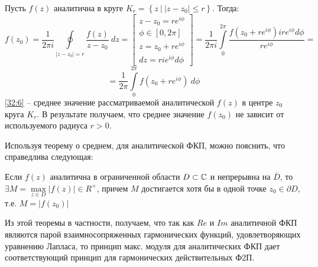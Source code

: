 \documentclass[../../main.tex]{subfiles}
\begin{document}
\begin{corollary*}	
	Пусть $f(z)$ аналитична в круге $K_r = \left\lbrace z \  \big| \ |z-z_0| \le r   \right\rbrace $. Тогда:
	\[   f(z_0) = \frac{1}{2 \pi i} \oint \limits_{|z-z_0| = r} \frac{f(z)}{z-z_0} \ dz = \left[\begin{gathered} z-z_0 = r e^{i\phi} \\
	\phi \in [0,2\pi]  \\
	z = z_0 + r e^{i\phi} \\
	dz = r i e^{i\phi} d \phi
	\end{gathered} \right] = \frac{1}{2 \pi i} \int \limits_{0}^{2\pi} \frac{f(z_0 +r e^{i\phi} ) i r e^{i\phi} d\phi}{r e^{i\phi}}  =     \]
	\begin{equation}
	\label{32:6}
	= \frac{1}{2 \pi } \int \limits_{0}^{2\pi} f(z_0 +r e^{i\phi} ) \ d \phi
	\end{equation}
	\eqref{32:6} \--- среднее значение рассматриваемой аналитической $f(z)$ в центре $z_0$ круга $K_r$. В результате получаем, что среднее значение $f(z_0)$ не зависит от используемого радиуса $r>0$.
\end{corollary*}
\begin{remark}
	Используя теорему о среднем, для аналитической ФКП, можно пояснить, что справедлива следующая:
\end{remark}
\begin{theorem}
	Если $f(z)$ аналитична в ограниченной области $D \subset \mathbb{C}$ и непрерывна на $\overline{D}$, то $\exists M = \max \limits_{z\in D} |f(z)| \in R^+$, причем $M$ достигается хотя бы в одной точке $z_0 \in \partial D$, т.е. $M = |f(z_0)|$
\end{theorem}		
Из этой теоремы в частности, получаем, что так как $Re$ и $Im$ аналитичной ФКП являются парой взаимносопряженных гармонических функций, удовлетворяющих уравнению Лапласа, то принцип макс. модуля для аналитических ФКП дает соответствующий принцип для гармонических действительных Ф2П.
	
\end{document}
